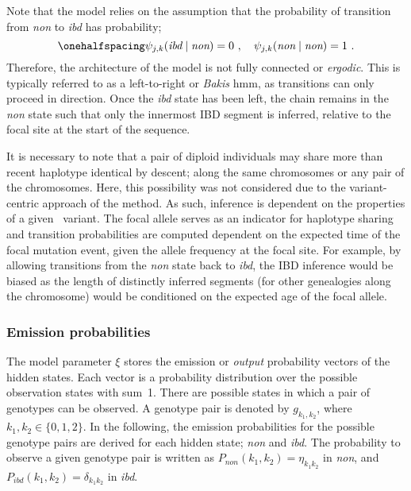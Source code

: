 Note that the model relies on the assumption that the probability of transition from \emph{non} to \emph{ibd} has  probability; \ie
\begin{equation*}\onehalfspacing
	\psi_{j,k}(\textit{ibd}\mid\textit{non}) = 0\ , \quad
	\psi_{j,k}(\textit{non}\mid\textit{non}) = 1\ .
\end{equation*}
Therefore, the architecture of the model is not fully connected or \emph{ergodic}.
This is typically referred to as a left-to-right or \emph{Bakis} \gls{hmm}, as transitions can only proceed in  direction.
Once the \emph{ibd} state has been left, the chain remains in the \emph{non} state such that only the innermost IBD segment is inferred, relative to the focal site at the start of the sequence.

%

%

It is necessary to note that a pair of diploid individuals may share more than  recent haplotype identical by descent; \eg along the same  chromosomes or any pair of the  chromosomes.
Here, this possibility was not considered due to the variant-centric approach of the method.
As such, inference is dependent on the properties of a given \fk{}~variant.
The focal allele serves as an indicator for haplotype sharing and transition probabilities are computed dependent on the expected time of the focal mutation event, given the allele frequency at the focal site.
For example, by allowing transitions from the \emph{non} state back to \emph{ibd},
the IBD inference would be biased as the length of distinctly inferred segments (\ie for other genealogies along the chromosome) would be conditioned on the expected age of the focal allele.


%
\subsubsection{Emission probabilities}
\label{sec:HmmEmiss}
%


The model parameter $\xi$ stores the emission or \emph{output} probability vectors of the hidden states.
Each vector is a probability distribution over the possible observation states with sum~1.
There are  possible states in which a pair of genotypes can be observed.
A genotype pair is denoted by ${g_{k_1,k_2}}$, where ${k_1,k_2 \in \{0,1,2\}}$.
In the following, the emission probabilities for the possible genotype pairs are derived for each hidden state; \emph{non} and \emph{ibd}.
The probability to observe a given genotype pair is written as ${P_\textit{non}(k_1,k_2) = \eta_{k_1 k_2}}$ in \emph{non}, and ${P_\textit{ibd}(k_1,k_2) = \delta_{k_1 k_2}}$ in \emph{ibd}.

